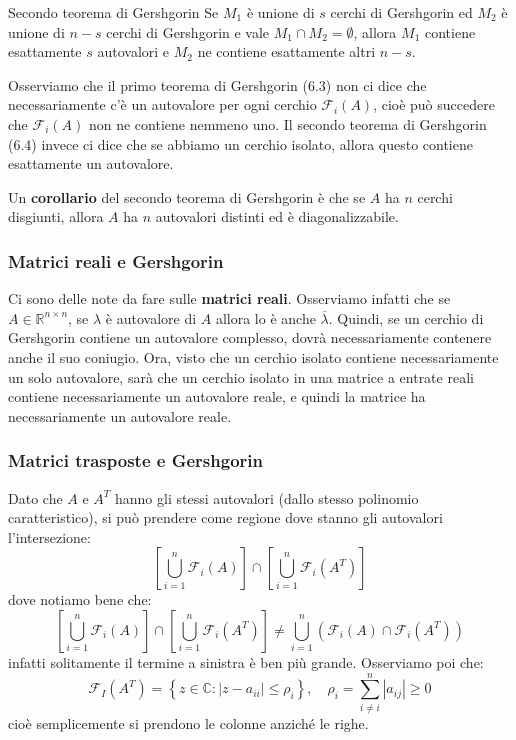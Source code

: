 \documentclass[a4paper,11pt]{article}
\begin{document}
\begin{theorem}{Secondo teorema di Gershgorin}
	Se $M_1$ è unione di $s$ cerchi di Gershgorin ed $M_2$ è unione di $n - s$ cerchi di Gershgorin e vale $M_1 \cap M_2 = \emptyset$, allora $M_1$ contiene esattamente $s$ autovalori e $M_2$ ne contiene esattamente altri $n - s$. 
\end{theorem}

Osserviamo che il primo teorema di Gershgorin (6.3) non ci dice che necessariamente c'è un autovalore per ogni cerchio $\mathcal{F}_i(A)$, cioè può succedere che $\mathcal{F}_i(A)$ non ne contiene nemmeno uno.
Il secondo teorema di Gershgorin (6.4) invece ci dice che se abbiamo un cerchio isolato, allora questo contiene esattamente un autovalore.

Un \textbf{corollario} del secondo teorema di Gershgorin è che se $A$ ha $n$ cerchi disgiunti, allora $A$ ha $n$ autovalori distinti ed è diagonalizzabile. 

\subsubsection{Matrici reali e Gershgorin}
Ci sono delle note da fare sulle \textbf{matrici reali}.
Osserviamo infatti che se $A \in \mathbb{R}^{n \times n}$, se $\lambda$ è autovalore di $A$ allora lo è anche $\overline{\lambda}$.
Quindi, se un cerchio di Gershgorin contiene un autovalore complesso, dovrà necessariamente contenere anche il suo coniugio.
Ora, visto che un cerchio isolato contiene necessariamente un solo autovalore, sarà che un cerchio isolato in una matrice a entrate reali contiene necessariamente un autovalore reale, e quindi la matrice ha necessariamente un autovalore reale.

\subsubsection{Matrici trasposte e Gershgorin}
Dato che $A$ e $A^T$ hanno gli stessi autovalori (dallo stesso polinomio caratteristico), si può prendere come regione dove stanno gli autovalori l'intersezione:
$$
\left[ \bigcup_{i = 1}^n \mathcal{F}_i(A) \right] \cap \left[ \bigcup_{i = 1}^n \mathcal{F}_i(A^T) \right]
$$
dove notiamo bene che:
$$
\left[ \bigcup_{i = 1}^n \mathcal{F}_i(A) \right] \cap \left[ \bigcup_{i = 1}^n \mathcal{F}_i(A^T) \right] \neq 
\bigcup_{i = 1}^n \left( \mathcal{F}_i(A) \cap \mathcal{F}_i(A^T) \right)
$$
infatti solitamente il termine a sinistra è ben più grande.
Osserviamo poi che:
$$
\mathcal{F}_I(A^T) = \left\{ z \in \mathbb{C} : |z - a_{ii}| \leq \rho_i \right\}, \quad \rho_i = \sum_{i \neq i}^n |a_{ij}| \geq 0
$$
cioè semplicemente si prendono le colonne anziché le righe. 
\end{document}
